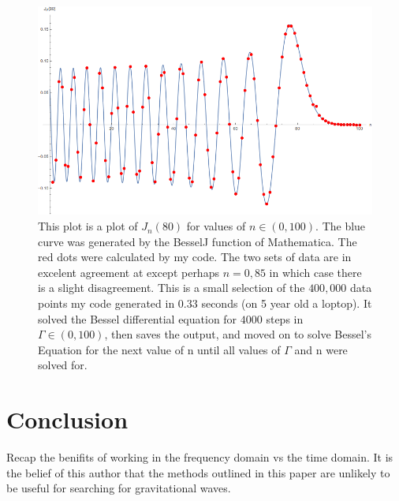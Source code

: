 \documentclass[onecolumn, groupedaddress, 10pt]{revtex4-1}
\begin{document}
\begin{figure}[t]
	\centering
	\includegraphics[width=.75\linewidth]{BesselJn80.png}
	\caption{This plot is a plot of $J_n(80)$ for values of $n\in (0,100)$.  The blue curve was generated by the BesselJ function of Mathematica.  The red dots were calculated by my code.  The two sets of data are in excelent agreement at except perhaps $n=0,85$ in which case there is a slight disagreement.  This is a small selection of the $400,000$ data points my code generated in $0.33$ seconds (on 5 year old a loptop).  It solved the Bessel differential equation for $4000$ steps in $\Gamma \in (0,100)$, then saves the output, and moved on to solve Bessel's Equation for the next value of n until all values of $\Gamma$ and n were solved for.}
\end{figure}



\section{Conclusion}
Recap the benifits of working in the frequency domain vs the time domain.
It is the belief of this author that the methods outlined in this paper are unlikely to be useful for searching for gravitational waves.  


\appendix
\onecolumngrid
\end{document}
